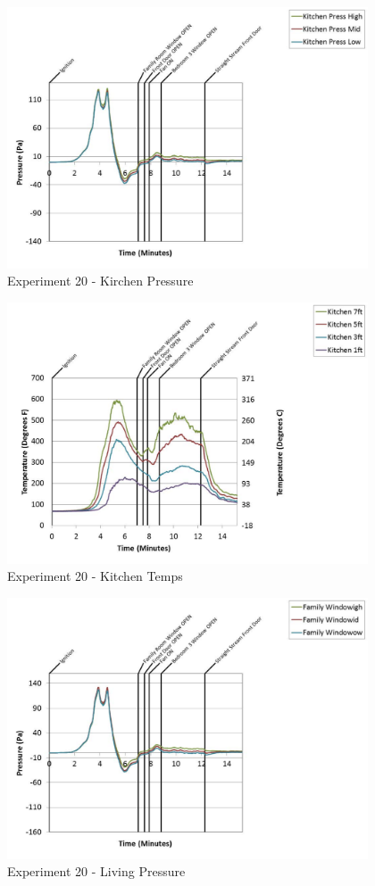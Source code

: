 \documentclass{article}
\begin{document}
\begin{appendices}
	\begin{figure}[h!]
		\centering
		\includegraphics[height=3.05in]{0_Images/Results_Charts/Exp_20_Charts/KirchenPressure.pdf}
		\caption{Experiment 20 - Kirchen Pressure}
	\end{figure}
 
	\clearpage

	\begin{figure}[h!]
		\centering
		\includegraphics[height=3.05in]{0_Images/Results_Charts/Exp_20_Charts/KitchenTemps.pdf}
		\caption{Experiment 20 - Kitchen Temps}
	\end{figure}
 

	\begin{figure}[h!]
		\centering
		\includegraphics[height=3.05in]{0_Images/Results_Charts/Exp_20_Charts/LivingPressure.pdf}
		\caption{Experiment 20 - Living Pressure}
	\end{figure}
 

\end{appendices}
\end{document}
